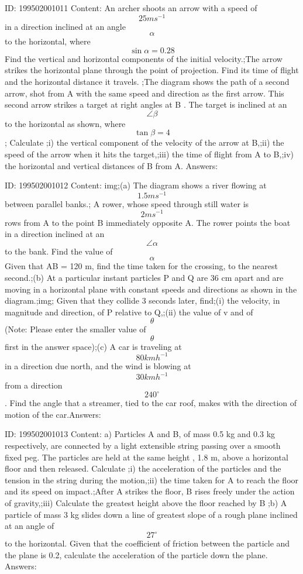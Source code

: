 \documentclass{article}
\begin{document}
ID: 199502001011
Content:
An archer shoots an arrow with a speed of \[25ms^{-1} \] in a direction inclined at an angle\[\alpha\] to the horizontal, where \[\sin \alpha  = 0.28\] Find the vertical and horizontal components of the initial velocity.;The arrow strikes the horizontal plane through the point of projection. Find its time of flight and the horizontal distance it travels. ;The diagram shows the path of a second arrow, shot from A with the same speed and direction as the first arrow. This second arrow strikes a target at right angles at B . The target is inclined at an \[\angle \beta \] to the horizontal as shown, where \[\tan \beta =4\] ; Calculate ;i) the vertical component of the velocity of the arrow at B,;ii) the speed of the arrow when it hits the target,;iii) the time of flight from A to B,;iv) the horizontal and vertical distances of B from A. Answers:

ID: 199502001012
Content:
img;(a) The diagram shows a river flowing at \[1.5 ms^{-1}\] between parallel banks.; A rower, whose speed through still water is \[2 ms^{-1}\] rows from A to the point B immediately opposite A. The rower points the boat in a direction inclined at an \[\angle \alpha \] to the bank. Find the value of \[\alpha \] Given that AB = 120 m, find the time taken for the crossing, to the nearest second.;(b) At a particular instant particles P and Q are 36 cm apart and are moving in a horizontal plane with constant speeds and directions as shown in the diagram.;img; Given that they collide 3 seconds later, find;(i) the velocity, in magnitude and direction, of P relative to Q,;(ii) the value of v and of \[\theta\] (Note: Please enter the smaller value of \[\theta\] first in the answer space);(c) A car is traveling at \[80 kmh ^{-1}\] in a direction due north, and the wind is blowing at \[30 kmh ^{-1}\] from a direction \[240^{\circ}\].  Find the angle that a streamer, tied to the car roof, makes with the direction of motion of the car.Answers:

ID: 199502001013
Content:
a) Particles A and B, of mass 0.5 kg and 0.3 kg respectively, are connected by a light extensible string passing over a smooth fixed peg. The particles are held at the same height , 1.8 m, above a horizontal floor and then released. Calculate 
;i) the acceleration of the particles and the tension in the string during the motion,;ii) the time taken for A to reach the floor and its speed on impact.;After A strikes the floor, B rises freely under the action of gravity,;iii) Calculate the greatest height above the floor reached by B ;b) A particle of mass 3 kg slides down a line of greatest slope of a rough plane inclined at an angle of \[27^{\circ}\]  to the horizontal. Given that the coefficient of friction between the particle and the plane is 0.2, calculate the acceleration of the particle down the plane.
Answers:
\end{document}
